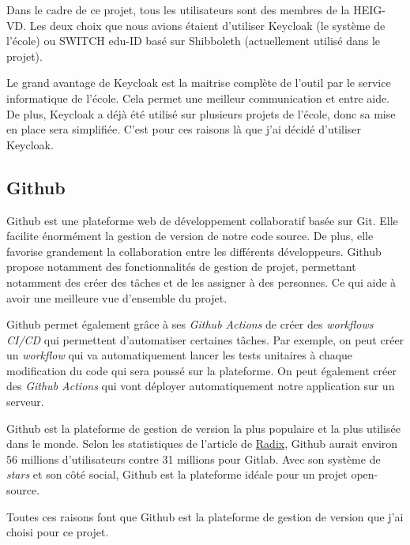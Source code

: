 Dans le cadre de ce projet, tous les utilisateurs sont des membres de la HEIG-VD. Les deux choix que nous avions étaient d'utiliser Keycloak (le système de l'école) ou SWITCH edu-ID basé sur Shibboleth (actuellement utilisé dans le projet).

Le grand avantage de Keycloak est la maitrise complète de l'outil par le service informatique de l'école. Cela permet une meilleur communication et entre aide. De plus, Keycloak a déjà été utilisé sur plusieurs projets de l'école, donc sa mise en place sera simplifiée.
C'est pour ces raisons là que j'ai décidé d'utiliser Keycloak.

\subsection{Github}
Github est une plateforme web de développement collaboratif basée sur Git. Elle facilite énormément la gestion de version de notre code source. De plus, elle favorise grandement la collaboration entre les différents développeurs. Github propose notamment des fonctionnalités de gestion de projet, permettant notamment des créer des tâches et de les assigner à des personnes. Ce qui aide à avoir une meilleure vue d'ensemble du projet.

Github permet également grâce à ses \emph{Github Actions} de créer des \emph{workflows CI/CD} qui permettent d'automatiser certaines tâches. Par exemple, on peut créer un \emph{workflow} qui va automatiquement lancer les tests unitaires à chaque modification du code qui sera poussé sur la plateforme. On peut également créer des \emph{Github Actions} qui vont déployer automatiquement notre application sur un serveur.

Github est la plateforme de gestion de version la plus populaire et la plus utilisée dans le monde. Selon les statistiques de l'article de \href{https://radixweb.com/blog/github-vs-gitlab}{Radix}, Github aurait environ 56 millions d'utilisateurs contre 31 millions pour Gitlab. Avec son système de \emph{stars} et son côté social, Github est la plateforme idéale pour un projet open-source.

Toutes ces raisons font que Github est la plateforme de gestion de version que j'ai choisi pour ce projet.

